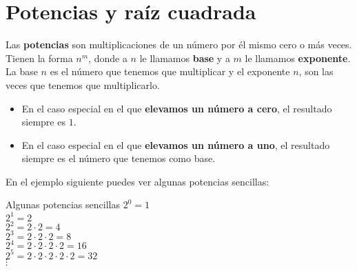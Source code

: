 \chapter{Potencias y raíz cuadrada}

Las \textbf{potencias} son multiplicaciones de un número por él mismo cero o más veces. Tienen la forma $n^m$, donde a $n$ le llamamos \textbf{base} y a $m$ le llamamos \textbf{exponente}. La base $n$ es el número que tenemos que multiplicar y el exponente $n$, son las veces que tenemos que multiplicarlo.

\begin{itemize}
    \item En el caso especial en el que \textbf{elevamos un número a cero}, el resultado siempre es $1$.
    \item En el caso especial en el que \textbf{elevamos un número a uno}, el resultado siempre es el número que tenemos como base.
\end{itemize}

En el ejemplo siguiente puedes ver algunas potencias sencillas:

\begin{ejemplos}[label={Ejemplo:potencias}]{Algunas potencias sencillas}
    $2^0 = 1$ \\
    $2^1 = 2$ \\
    $2^2 = 2 \cdot 2 = 4$ \\
    $2^3 = 2 \cdot 2 \cdot 2 = 8$ \\
    $2^4 = 2 \cdot 2 \cdot 2 \cdot 2 = 16$ \\
    $2^5 = 2 \cdot 2 \cdot 2 \cdot 2 \cdot 2 = 32$ \\
    $\vdots$
\end{ejemplos}